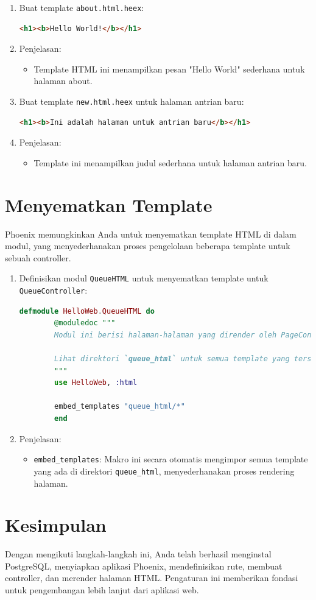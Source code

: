 \begin{enumerate}
	\item Buat template \texttt{about.html.heex}:
	\begin{lstlisting}[language=html]
		<h1><b>Hello World!</b></h1>
	\end{lstlisting}
	
	\item Penjelasan:
	\begin{itemize}
		\item Template HTML ini menampilkan pesan "Hello World" sederhana untuk halaman about.
	\end{itemize}
	
	\item Buat template \texttt{new.html.heex} untuk halaman antrian baru:
	\begin{lstlisting}[language=html]
		<h1><b>Ini adalah halaman untuk antrian baru</b></h1>
	\end{lstlisting}
	
	\item Penjelasan:
	\begin{itemize}
		\item Template ini menampilkan judul sederhana untuk halaman antrian baru.
	\end{itemize}
\end{enumerate}

\section{Menyematkan Template}
Phoenix memungkinkan Anda untuk menyematkan template HTML di dalam modul, yang menyederhanakan proses pengelolaan beberapa template untuk sebuah controller.

\begin{enumerate}
	\item Definisikan modul \texttt{QueueHTML} untuk menyematkan template untuk \texttt{QueueController}:
	\begin{lstlisting}[language=Elixir]
		defmodule HelloWeb.QueueHTML do
		@moduledoc """
		Modul ini berisi halaman-halaman yang dirender oleh PageController.
		
		Lihat direktori `queue_html` untuk semua template yang tersedia.
		"""
		use HelloWeb, :html
		
		embed_templates "queue_html/*"
		end
	\end{lstlisting}
	
	\item Penjelasan:
	\begin{itemize}
		\item \texttt{embed\_templates}: Makro ini secara otomatis mengimpor semua template yang ada di direktori \texttt{queue\_html}, menyederhanakan proses rendering halaman.
	\end{itemize}
\end{enumerate}

\section{Kesimpulan}
Dengan mengikuti langkah-langkah ini, Anda telah berhasil menginstal PostgreSQL, menyiapkan aplikasi Phoenix, mendefinisikan rute, membuat controller, dan merender halaman HTML. Pengaturan ini memberikan fondasi untuk pengembangan lebih lanjut dari aplikasi web.
